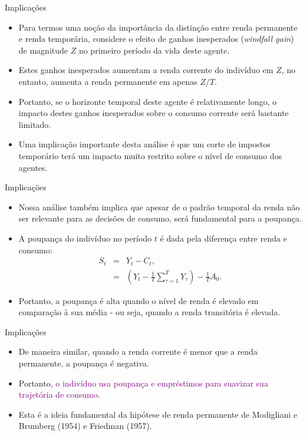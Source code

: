 \documentclass[10pt]{beamer}
\begin{document}
\begin{frame}{Implicações}
    \begin{itemize}
        \item Para termos uma noção da importância da distinção entre renda permanente e renda temporária, considere o efeito de ganhos inesperados (\emph{windfall gain}) de magnitude $Z$ no primeiro período da vida deste agente.
        \bigskip
        \item Estes ganhos inesperados aumentam a renda corrente do indivíduo em $Z$, no entanto, aumenta a renda permanente em apenas $Z/T$.
        \bigskip
        \item Portanto, se o horizonte temporal deste agente é relativamente longo, o impacto destes ganhos inesperados sobre o consumo corrente será bastante limitado.
        \bigskip
        \item Uma implicação importante desta análise é que um corte de impostos temporário terá um impacto muito restrito sobre o nível de consumo dos agentes.
    \end{itemize}
\end{frame}

\begin{frame}{Implicações}
    \begin{itemize}
        \item Nossa análise também implica que apesar de o padrão temporal da renda não ser relevante para as decisões de consumo, será fundamental para a poupança.
        \bigskip
        \item A poupança do indivíduo no período $t$ é dada pela diferença entre renda e consumo:
        \begin{eqnarray}
            S_t &=& Y_t - C_t, \nonumber \\
            &=& \left(Y_t - \frac{1}{T}\sum_{\tau=1}^T Y_\tau\right) - \frac{1}{T}A_0. \label{eq7}
        \end{eqnarray}
        \bigskip
        \item Portanto, a poupança é alta quando o nível de renda é elevado em comparação à sua média - ou seja, quando a renda transitória é elevada.
    \end{itemize}
\end{frame}

\begin{frame}{Implicações}
    \begin{itemize}
        \item De maneira similar, quando a renda corrente é menor que a renda permanente, a poupança é negativa.
        \bigskip
        \item Portanto, \textcolor{purple}{o indivíduo usa poupança e empréstimos para suavizar sua trajetória de consumo}.
        \bigskip
        \item Esta é a ideia fundamental da hipótese de renda permanente de Modigliani e Brumberg (1954) e Friedman (1957).
    \end{itemize}
\end{frame}
\end{document}
